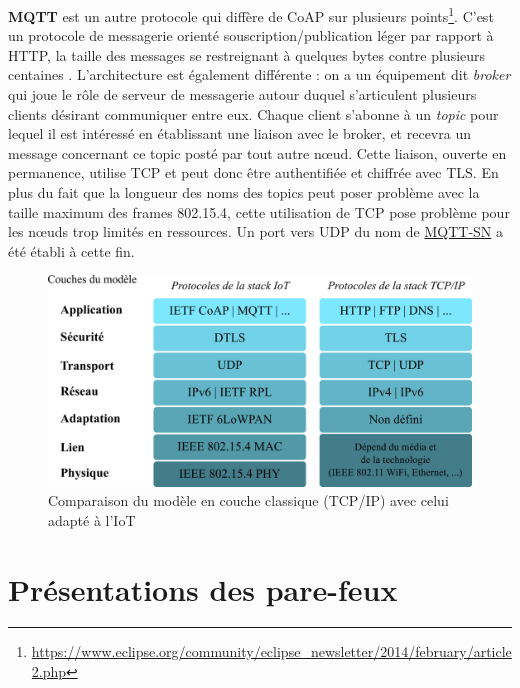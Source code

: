 \documentclass[]{article}
\begin{document}
\par \textbf{MQTT} est un autre protocole qui diffère de CoAP sur plusieurs points\footnote{\url{https://www.eclipse.org/community/eclipse_newsletter/2014/february/article2.php}}. C'est un protocole de messagerie orienté souscription/publication léger par rapport à HTTP, la taille des messages se restreignant à quelques bytes contre plusieurs centaines \cite{Leos2014}. L'architecture est également différente : on a un équipement dit \textit{broker} qui joue le rôle de serveur de messagerie autour duquel s'articulent plusieurs clients désirant communiquer entre eux. Chaque client s'abonne à un \textit{topic} pour lequel il est intéressé en établissant une liaison avec le broker, et recevra un message concernant ce topic posté par tout autre nœud. Cette liaison, ouverte en permanence, utilise TCP et peut donc être authentifiée et chiffrée avec TLS. En plus du fait que la longueur des noms des topics peut poser problème avec la taille maximum des frames 802.15.4, cette utilisation de TCP pose problème pour les nœuds trop limités en ressources. Un port vers UDP du nom de \href{http://www.mqtt.org/new/wp-content/uploads/2009/06/MQTT-SN_spec_v1.2.pdf}{MQTT-SN} a été établi à cette fin.\\

\begin{figure}[!h]
\centering
\includegraphics[scale=0.85]{IoT_stack.png}
\caption{Comparaison du modèle en couche classique (TCP/IP) avec celui adapté à l'IoT}
\label{IoT_stack}
\end{figure}


\section{Présentations des pare-feux}
\end{document}
